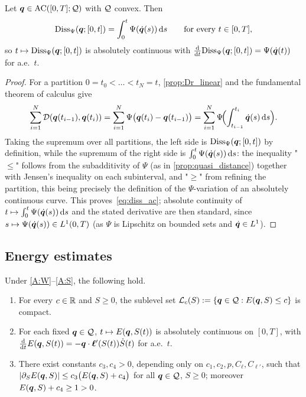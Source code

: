 \begin{lemma}\label{lem:diss_ac}
Let $\bm{q}\in\mathrm{AC}([0,T];\mathcal{Q})$ with $\mathcal{Q}$ convex. Then
\begin{equation}\label{eq:diss_ac}
  \mathrm{Diss}_\Psi(\bm{q};[0,t])=\int_0^t\Psi(\dot{\bm{q}}(s))\mathop{}\!\mathrm{d} s
  \qquad\text{for every }t\in[0,T],
\end{equation}
so $t\mapsto\mathrm{Diss}_\Psi(\bm{q};[0,t])$ is absolutely continuous with
$\tfrac{\mathop{}\!\mathrm{d}}{\mathop{}\!\mathrm{d} t}\mathrm{Diss}_\Psi(\bm{q};[0,t])=\Psi(\dot{\bm{q}}(t))$ for a.e.\
$t$.
\end{lemma}

\begin{proof}
For a partition $0=t_0<\dots<t_N=t$, \cref{prop:Dr_linear} and the
fundamental theorem of calculus give
\[
  \sum_{i=1}^{N}\mathcal{D}(\bm{q}(t_{i-1}),\bm{q}(t_i))
  =\sum_{i=1}^{N}\Psi\bigl(\bm{q}(t_i)-\bm{q}(t_{i-1})\bigr)
  =\sum_{i=1}^{N}\Psi\!\Bigl(\int_{t_{i-1}}^{t_i}\dot{\bm{q}}(s)  \mathop{}\!\mathrm{d} s \Bigr).
\]
Taking the supremum over all partitions, the left side is
$\mathrm{Diss}_\Psi(\bm{q};[0,t])$ by definition, while the supremum of the right
side is $\int_0^t\Psi(\dot{\bm{q}}(s))\mathop{}\!\mathrm{d} s$: the inequality "$\le$" follows from
the subadditivity of $\Psi$ (as in \cref{prop:quasi_distance}) together
with Jensen's inequality on each subinterval, and "$\ge$" from
refining the partition, this being precisely the definition of the
$\Psi$-variation of an absolutely continuous curve. This
proves~\eqref{eq:diss_ac}; absolute continuity of $t\mapsto\int_0^t\Psi(\dot{\bm{q}}(s))\mathop{}\!\mathrm{d} s$
and the stated derivative are then standard, since
$s\mapsto\Psi(\dot{\bm{q}}(s))\in L^1(0,T)$ (as $\Psi$ is Lipschitz on
bounded sets and $\dot{\bm{q}}\in L^1$).
\end{proof}

\subsection{Energy estimates}

\begin{proposition}\label{prop:power}
Under \ref{A:W}--\ref{A:S}, the following hold.
\begin{enumerate}[label=\textnormal{(E\arabic*)},leftmargin=2.6em,itemsep=2pt]
  \item\label{E:compact} For every $c\in\mathbb{R}$ and $S\ge0$, the sublevel
  set $\mathcal L_c(S):=\{\bm{q}\in\mathcal{Q}:E(\bm{q},S)\le c\}$ is compact.
  \item\label{E:AC} For each fixed $\bm{q}\in\mathcal{Q}$, $t\mapsto E(\bm{q},S(t))$
  is absolutely continuous on $[0,T]$, with
  $\frac{\mathop{}\!\mathrm{d}}{\mathop{}\!\mathrm{d} t}E(\bm{q},S(t))=-\bm{q}\cdot\bm{\ell}'(S(t))\dot S(t)$ for
  a.e.\ $t$.
  \item\label{E:gronwall} There exist constants $c_3,c_4>0$, depending
  only on $c_1,c_2,p,C_\ell,C_{\ell'}$, such that
  $|\partial_S E(\bm{q},S)|\le c_3\bigl(E(\bm{q},S)+c_4\bigr)$ for all
  $\bm{q}\in\mathcal{Q}$, $S\ge0$; moreover $E(\bm{q},S)+c_4\ge1>0$.
\end{enumerate}
\end{proposition}

